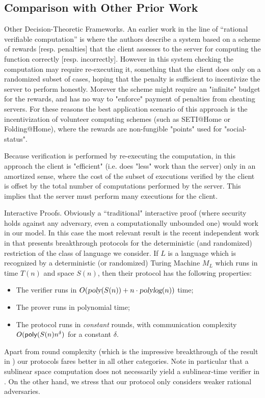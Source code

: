 \subsection{Comparison with Other Prior Work}
\label{sec:prior}

{\sc Other Decision-Theoretic Frameworks.}
An earlier work in the line of ``rational verifiable computation'' is \cite{b08} where the authors describe a system based on a scheme of rewards [resp. penalties] that the client assesses to the server for computing the function correctly [resp. incorrectly]. However in this system checking the computation may require re-executing it, something that the client does only on a randomized subset of cases, hoping that the penalty is sufficient to incentivize the server to perform honestly. Morever the scheme might require an "infinite" budget for the rewards, and has no way to "enforce" payment of penalties from cheating servers. For these reasons the best application scenario of this approach is the incentivization of volunteer computing schemes (such as SETI@Home or Folding@Home), where the rewards are non-fungible "points" used for "social-status". 

Because verification is performed by re-executing the computation, in this approach the client is "efficient" (i.e. does "less" work than the server) only in an 
amortized sense, where the cost of the subset of executions verified by the client is offset by the total number of computations performed by the server. This implies that the server must perform many executions for the client. 

{\sc Interactive Proofs.}
Obviously a ``traditional" interactive proof (where security holds against any adversary, even a computationally unbounded one) would work in our model. In this case the most relevant result is 
the recent independent work in \cite{rrr16} that presents breakthrough protocols for the deterministic (and randomized) restriction of the class of language we consider. If $L$ is a language which is recognized by a deterministic (or randomized) Turing Machine $M_L$ which runs in time $T(n)$ and space $S(n)$, then their protocol has the following properties: 
\begin{itemize}
	\item The verifier runs in 
	$O({\textsl{poly}}(S(n)) + n \cdot{\ensuremath{\textsl{polylog}}}(n))$ time;
	\item The prover runs in polynomial time;
	\item The protocol runs in {\em constant} rounds, with communication complexity $O({\sf poly}(S(n)n^{\delta})$ for a constant $\delta$.
\end{itemize}
Apart from round complexity (which is the impressive breakthrough of the result in \cite{rrr16}) our protocols fares better in all other categories. Note in particular that a sublinear space computation does not necessarily yield a sublinear-time verifier in 
\cite{rrr16}. On the other hand, we stress that our protocol only considers weaker rational adversaries. 

